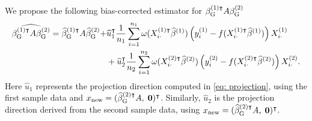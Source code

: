 We propose the following bias-corrected estimator for $\beta_{\mathrm{G}}^{(1)\intercal} A \beta_{\mathrm{G}}^{(2)}$
\begin{equation}
    \begin{aligned}
        \widehat{\beta_{\mathrm{G}}^{(1)\intercal}A\beta_{\mathrm{G}}^{(2)}} = \widehat{\beta}_{\mathrm{G}}^{(1)\intercal}A\widehat{\beta}_{\mathrm{G}}^{(2)} + & \widehat{u}_1^{\intercal}\frac{1}{n_1}\sum_{i=1}^{n_1}\omega(X_{i\cdot}^{(1)\intercal}\widehat{\beta}^{(1)})\left(y_i^{(1)} - f(X_{i\cdot}^{(1)\intercal}\widehat{\beta}^{(1)})\right)X_{i\cdot}^{(1)} \\
        & + \widehat{u}_2^{\intercal}\frac{1}{n_2}\sum_{i=1}^{n_2}\omega(X_{i\cdot}^{(2)\intercal}\widehat{\beta}^{(2)})\left(y_i^{(2)} - f(X_{i\cdot}^{(2)\intercal}\widehat{\beta}^{(2)})\right)X_{i\cdot}^{(2)}.
    \end{aligned}
    \label{eq: point-inner}
\end{equation}
Here $\widehat{u}_1$ represents the projection direction computed in \eqref{eq: projection}, using the first sample data and $x_{\rm new} = ( \widehat{\beta}_{\textrm{G}}^{(2)\intercal} A, \; \mathbf{0})^\intercal$. Similarly, $\widehat{u}_2$ is the projection direction derived from the second sample data, using $x_{\rm new} = ( \widehat{\beta}_{\textrm{G}}^{(2)\intercal} A, \; \mathbf{0})^\intercal$.
